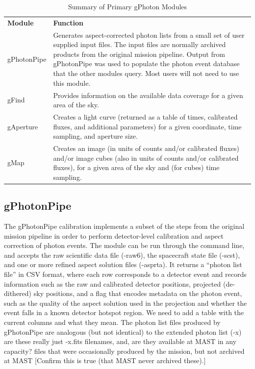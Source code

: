 \documentclass[5p]{elsarticle}
\begin{document}
\begin{table}
\begin{tabular}{|p{2cm}|p{6cm}|}
\hline
	{\bf Module} & {\bf Function}\\
	gPhotonPipe & Generates aspect-corrected photon lists from a small set of user supplied input files.  The input files are normally archived products from the original mission pipeline. Output from gPhotonPipe was used to populate the photon event database that the other modules query.  Most users will not need to use this module.\\\hline
	gFind & Provides information on the available data coverage for a given area of the sky.\\\hline
	gAperture & Creates a light curve (returned as a table of times, calibrated fluxes, and additional parameters) for a given coordinate, time sampling, and aperture size.\\\hline
	gMap & Creates an image (in units of counts and/or calibrated fluxes) and/or image cubes (also in units of counts and/or calibrated fluxes), for a given area of the sky and (for cubes) time sampling.\\
\hline
\end{tabular}
\caption{Summary of Primary gPhoton Modules}
\label{moduledesc}
\end{table}

\subsection{gPhotonPipe}
The gPhotonPipe calibration implements a subset of the steps from the original mission pipeline in order to perform detector-level calibration and aspect correction of photon events. The module can be run through the command line, and accepts the raw scientific data file (-raw6), the spacecraft state file (-scst), and one or more refined aspect solution files (-asprta). It returns a ``photon list file'' in CSV format, where each row corresponds to a detector event and records information such as the raw and calibrated detector positions, projected (de-dithered) sky positions, and a flag that encodes metadata on the photon event, such as the quality of the aspect solution used in the projection and whether the event falls in a known detector hotspot region.  {\color{red}We need to add a table with the current columns and what they mean.} The photon list files produced by gPhotonPipe are analogous (but not identical) to the extended photon list {\color{red}(-x) are these really just -x.fits filenames, and, are they available at MAST in any capacity?} files that were occasionally produced by the mission, but not archived at MAST {\color{red}[Confirm this is true (that MAST never archived these).]}
\end{document}
